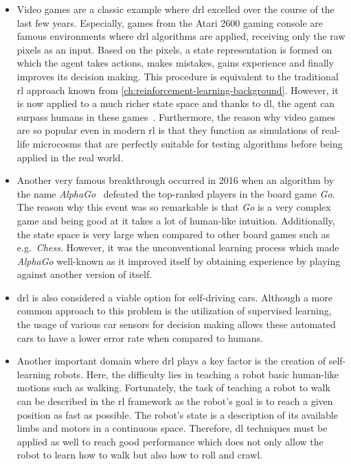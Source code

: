 \documentclass[draft,final]{vutinfth} %
\begin{document}
    \begin{itemize}
        \item Video games are a classic example where \gls{drl} excelled over the course of the last few years.
        Especially, games from the Atari 2600 gaming console are famous environments where \gls{drl} algorithms are applied, receiving only the raw pixels as an input.
        Based on the pixels, a state representation is formed on which the agent takes actions, makes mistakes, gains experience and finally improves its decision making.
        This procedure is equivalent to the traditional \gls{rl} approach known from \autoref{ch:reinforcement-learning-background}.
        However, it is now applied to a much richer state space and thanks to \gls{dl}, the agent can surpass humans in these games~\citep{mnih_playing_2013,schulman_trust_2015}.
        Furthermore, the reason why video games are so popular even in modern \gls{rl} is that they function as simulations of real-life microcosms that are perfectly suitable for testing algorithms before being applied in the real world.

        \item   Another very famous breakthrough occurred in 2016 when an algorithm by the name \textit{AlphaGo}~\citep{silver_mastering_2017} defeated the top-ranked players in the board game \textit{Go}.
        The reason why this event was so remarkable is that \textit{Go} is a very complex game and being good at it takes a lot of human-like intuition.
        Additionally, the state space is very large when compared to other board games such as e.g.\ \textit{Chess}.
        However, it was the unconventional learning process which made \textit{AlphaGo} well-known as it improved itself by obtaining experience by playing against another version of itself.

        \item   \gls{drl} is also considered a viable option for self-driving cars.
        Although a more common approach to this problem is the utilization of supervised learning, the usage of various car sensors for decision making allows these automated cars to have a lower error rate when compared to humans.
        \item   Another important domain where \gls{drl} plays a key factor is the creation of self-learning robots.
        Here, the difficulty lies in teaching a robot basic human-like motions such as walking.
        Fortunately, the task of teaching a robot to walk can be described in the \gls{rl} framework as the robot's goal is to reach a given position as fast as possible.
        The robot's state is a description of its available limbs and motors in a continuous space.
        Therefore, \gls{dl} techniques must be applied as well to reach good performance which does not only allow the robot to learn how to walk but also how to roll and crawl.
    \end{itemize}
\end{document}
